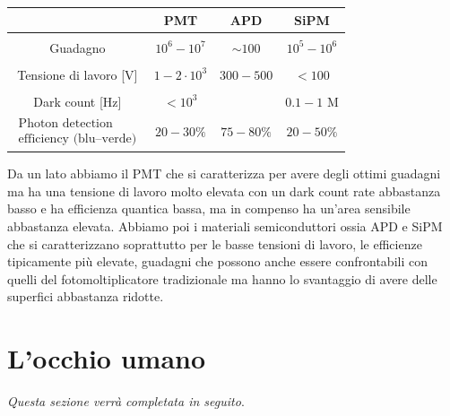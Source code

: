 \begin{center}
   \begin{tabular}{|c|c|c|c|}
      \hline
       & PMT & APD & SiPM\\
      \hline
      &&&\\[-0.45cm]
      Guadagno & $10^6-10^7$ & $\sim 100$ & $10^5-10^6$\\
      \hline
      &&&\\[-0.45cm]
      Tensione di lavoro [V] & $1-2 \cdot 10^3$ & $300 - 500$ & $<100$\\
      \hline
      &&&\\[-0.45cm]
      Dark count [Hz] & $<10^3$ & & $0.1-1$ M\\
      \hline
      $\begin{array}{cc}
         \text{Photon detection}\\
         \text{efficiency (blu--verde)}
      \end{array}$
      & $20-30\%$ & $75-80\%$ & $20-50\%$\\
      \hline
   \end{tabular}
\end{center}
Da un lato abbiamo il PMT che si caratterizza per avere degli ottimi guadagni ma ha una tensione di lavoro molto elevata con un dark count rate abbastanza basso e ha efficienza quantica bassa, ma in compenso ha un'area sensibile abbastanza elevata. Abbiamo poi i materiali semiconduttori ossia APD e SiPM che si caratterizzano soprattutto per le basse tensioni di lavoro, le efficienze tipicamente più elevate, guadagni che possono anche essere confrontabili con quelli del fotomoltiplicatore tradizionale ma hanno lo svantaggio di avere delle superfici abbastanza ridotte.

\section{L'occhio umano}

\textit{Questa sezione verrà completata in seguito}.


